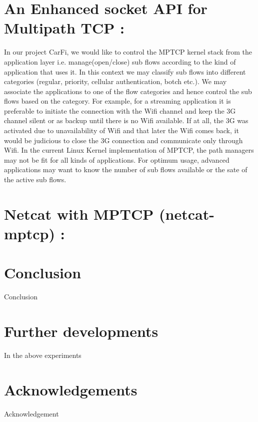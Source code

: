 \documentclass[a4paper,11pt]{article}
\begin{document}
	\clearpage
	\section{An Enhanced socket API for Multipath TCP : }

		\label{sec:mptcpapi}
		In our project CarFi, we would like to control the MPTCP kernel stack from the application layer i.e. manage(open/close) sub flows according to the kind of application that uses it. In this context we may classify sub flows into different categories (regular, priority, cellular authentication, botch etc.). We may associate the applications to one of the flow categories and hence control the sub flows based on the category. For example, for a streaming application it is preferable to initiate the connection with the Wifi channel and keep the 3G channel silent or as backup until there is no Wifi available. If at all, the 3G was activated due to unavailability of Wifi and that later the Wifi comes back, it would be judicious to close the 3G connection and communicate only through Wifi.
		In the current Linux Kernel implementation of MPTCP, the path managers may not be fit for all kinds of applications. For optimum usage, advanced applications may want to know the number of sub flows available or the sate of the active sub flows.

		
	\clearpage
	\section{Netcat with MPTCP (netcat-mptcp) :}

		\label{sec:netcat-mptcp}
			
			
	\clearpage
	\section{Conclusion}
		\label{sec:conclusion}
	 	Conclusion
		 	
		 
	\clearpage
	\section{Further developments}
		\label{sec:furtherdevelopment}
		In the above experiments 
			
		 	
		 	
	\clearpage
	\section{Acknowledgements}
	 
	  	Acknowledgement
		 
\end{document}
